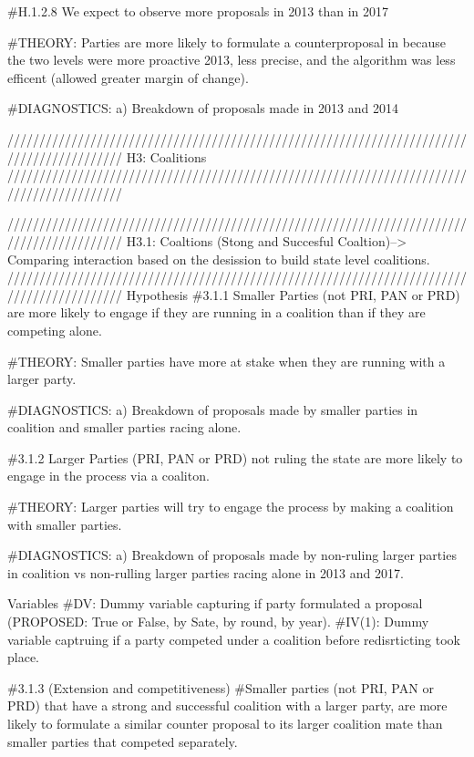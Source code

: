 \documentclass[
]{article}
\begin{document}
\#H.1.2.8 We expect to observe more proposals in 2013 than in 2017

\#THEORY: Parties are more likely to formulate a counterproposal in
because the two levels were more proactive 2013, less precise, and the
algorithm was less efficent (allowed greater margin of change).

\#DIAGNOSTICS: a) Breakdown of proposals made in 2013 and 2014

//////////////////////////////////////////////////////////////////////////////////////////
H3: Coalitions
//////////////////////////////////////////////////////////////////////////////////////////

//////////////////////////////////////////////////////////////////////////////////////////
H3.1: Coaltions (Stong and Succesful Coaltion)--\textgreater{} Comparing
interaction based on the desission to build state level coalitions.\\
//////////////////////////////////////////////////////////////////////////////////////////
Hypothesis \#3.1.1 Smaller Parties (not PRI, PAN or PRD) are more likely
to engage if they are running in a coalition than if they are competing
alone.

\#THEORY: Smaller parties have more at stake when they are running with
a larger party.

\#DIAGNOSTICS: a) Breakdown of proposals made by smaller parties in
coalition and smaller parties racing alone.

\#3.1.2 Larger Parties (PRI, PAN or PRD) not ruling the state are more
likely to engage in the process via a coaliton.

\#THEORY: Larger parties will try to engage the process by making a
coalition with smaller parties.

\#DIAGNOSTICS: a) Breakdown of proposals made by non-ruling larger
parties in coalition vs non-rulling larger parties racing alone in 2013
and 2017.

Variables \#DV: Dummy variable capturing if party formulated a proposal
(PROPOSED: True or False, by Sate, by round, by year). \#IV(1): Dummy
variable captruing if a party competed under a coalition before
redisrticting took place.

\#3.1.3 (Extension and competitiveness) \#Smaller parties (not PRI, PAN
or PRD) that have a strong and successful coalition with a larger party,
are more likely to formulate a similar counter proposal to its larger
coalition mate than smaller parties that competed separately.
\end{document}
